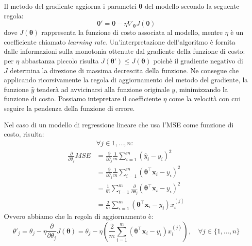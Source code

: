 Il metodo del gradiente aggiorna i parametri $\bm \theta$ del modello secondo
la seguente regola: 
\begin{equation} \label{eq:grad-up}
  \bm \theta' = \bm \theta - \eta \nabla_{\bm \theta} J(\bm \theta) 
\end{equation}
dove $J(\bm \theta)$ rappresenta la funzione di costo associata al modello,
mentre $\eta$ è un coefficiente chiamato \emph{learning rate}.
Un'interpretazione dell'algoritmo è fornita dalle informazioni sulla monotonia
ottenute dal gradiente della funzione di costo: per $\eta$ abbastanza piccolo
risulta $J(\bm \theta') \leq J(\bm \theta)$ poichè il gradiente negativo di $J$
determina la direzione di massima decrescita della funzione\cite{goodfellow}.
Ne consegue che applicando ricorsivamente la regola di aggiornamento del metodo
del gradiente, la funzione $\hat{y}$ tenderà ad avvicinarsi alla funzione
originale $y$, minimizzando la funzione di costo.  Possiamo intepretare il
coefficiente $\eta$ come la velocità con cui seguire la pendenza della funzione
di errore.

Nel caso di un modello di regressione lineare che usa l'MSE come funzione di
costo, risulta: 
\begin{align*}
  & \forall j \in {1, \dotsc, n}: \\
  \frac{\partial}{\partial\theta_j} MSE &= 
  \frac{\partial}{\partial\theta_j} \frac{1}{m} \sum_{i=1}^m{{(\hat{y}_i -
    y_i)}^2} \\ 
  &= \frac{\partial}{\partial\theta_j} \frac{1}{m}
  \sum_{i=1}^m{{(\bm \theta^\intercal \bm x_i - y_i)}^2} \\
  &= \frac{1}{m}
  \sum_{i=1}^m{\frac{\partial}{\partial\theta_j}{(\bm \theta^\intercal \bm x_i -
    y_i)}^2} \\
  &= \frac{2}{m}
  \sum_{i=1}^m{(\bm \theta^\intercal \bm x_i - y_i)x_i^{(j)}}
\end{align*}
%
Ovvero abbiamo che la regola di aggiornamento è:
\[ \theta'_j = \theta_j - \eta \frac{\partial}{\partial\theta_j} J(\bm \theta)
             = \theta_j - \eta (\frac{2}{m} 
             \sum_{i=1}^m{(\bm \theta^\intercal \bm x_i - y_i)x_i^{(j)}}),
             \quad \forall j \in \{1, \dotsc, n\}
           \]

